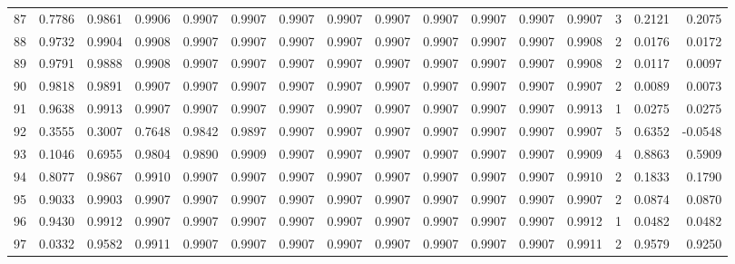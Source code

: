\begin{tabular}{lrrrrrrrrrrrrrrr}
87  &      0.7786 &  0.9861 &  0.9906 &  0.9907 &  0.9907 &  0.9907 &  0.9907 &  0.9907 &  0.9907 &  0.9907 &   0.9907 &     0.9907 &      3 &                    0.2121 &                     0.2075 \\
88  &      0.9732 &  0.9904 &  0.9908 &  0.9907 &  0.9907 &  0.9907 &  0.9907 &  0.9907 &  0.9907 &  0.9907 &   0.9907 &     0.9908 &      2 &                    0.0176 &                     0.0172 \\
89  &      0.9791 &  0.9888 &  0.9908 &  0.9907 &  0.9907 &  0.9907 &  0.9907 &  0.9907 &  0.9907 &  0.9907 &   0.9907 &     0.9908 &      2 &                    0.0117 &                     0.0097 \\
90  &      0.9818 &  0.9891 &  0.9907 &  0.9907 &  0.9907 &  0.9907 &  0.9907 &  0.9907 &  0.9907 &  0.9907 &   0.9907 &     0.9907 &      2 &                    0.0089 &                     0.0073 \\
91  &      0.9638 &  0.9913 &  0.9907 &  0.9907 &  0.9907 &  0.9907 &  0.9907 &  0.9907 &  0.9907 &  0.9907 &   0.9907 &     0.9913 &      1 &                    0.0275 &                     0.0275 \\
92  &      0.3555 &  0.3007 &  0.7648 &  0.9842 &  0.9897 &  0.9907 &  0.9907 &  0.9907 &  0.9907 &  0.9907 &   0.9907 &     0.9907 &      5 &                    0.6352 &                    -0.0548 \\
93  &      0.1046 &  0.6955 &  0.9804 &  0.9890 &  0.9909 &  0.9907 &  0.9907 &  0.9907 &  0.9907 &  0.9907 &   0.9907 &     0.9909 &      4 &                    0.8863 &                     0.5909 \\
94  &      0.8077 &  0.9867 &  0.9910 &  0.9907 &  0.9907 &  0.9907 &  0.9907 &  0.9907 &  0.9907 &  0.9907 &   0.9907 &     0.9910 &      2 &                    0.1833 &                     0.1790 \\
95  &      0.9033 &  0.9903 &  0.9907 &  0.9907 &  0.9907 &  0.9907 &  0.9907 &  0.9907 &  0.9907 &  0.9907 &   0.9907 &     0.9907 &      2 &                    0.0874 &                     0.0870 \\
96  &      0.9430 &  0.9912 &  0.9907 &  0.9907 &  0.9907 &  0.9907 &  0.9907 &  0.9907 &  0.9907 &  0.9907 &   0.9907 &     0.9912 &      1 &                    0.0482 &                     0.0482 \\
97  &      0.0332 &  0.9582 &  0.9911 &  0.9907 &  0.9907 &  0.9907 &  0.9907 &  0.9907 &  0.9907 &  0.9907 &   0.9907 &     0.9911 &      2 &                    0.9579 &                     0.9250 \\

\end{tabular}
